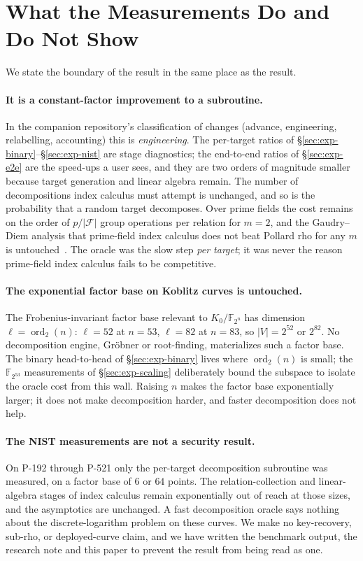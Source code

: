 \documentclass[10pt,a4paper]{article}
\theoremstyle{remark}
\newcommand{\FF}{\mathbb{F}}
\newcommand{\Fb}{\mathcal{F}}
\newcommand{\abs}[1]{\lvert #1 \rvert}
\begin{document}
\section{What the Measurements Do and Do Not Show}
\label{sec:boundary}

We state the boundary of the result in the same place as the result.

\paragraph{It is a constant-factor improvement to a subroutine.} In the
companion repository's classification of changes (advance, engineering,
relabelling, accounting) this is \emph{engineering}. The per-target
ratios of \S\ref{sec:exp-binary}--\S\ref{sec:exp-nist} are stage
diagnostics; the end-to-end ratios of \S\ref{sec:exp-e2e} are the
speed-ups a user sees, and they are two orders of magnitude smaller
because target generation and linear algebra remain. The
number of decompositions index calculus must attempt is unchanged, and
so is the probability that a random target decomposes. Over prime
fields the cost remains on the order of $p/\abs{\Fb}$ group operations
per relation for $m = 2$, and the Gaudry--Diem analysis that
prime-field index calculus does not beat Pollard rho for any $m$ is
untouched~\cite{gaudry2009,diem2011}. The oracle was the slow step
\emph{per target}; it was never the reason prime-field index calculus
fails to be competitive.

\paragraph{The exponential factor base on Koblitz curves is untouched.}
The Frobenius-invariant factor base relevant to $K_0/\FF_{2^n}$ has
dimension $\ell = \operatorname{ord}_2(n)$: $\ell = 52$ at $n = 53$,
$\ell = 82$ at $n = 83$, so $\abs{V} = 2^{52}$ or $2^{82}$. No
decomposition engine, Gr\"obner or root-finding, materializes such a
factor base. The binary head-to-head of \S\ref{sec:exp-binary} lives
where $\operatorname{ord}_2(n)$ is small; the $\FF_{2^{53}}$
measurements of \S\ref{sec:exp-scaling} deliberately bound the subspace
to isolate the oracle cost from this wall. Raising $n$ makes the factor
base exponentially larger; it does not make decomposition harder, and
faster decomposition does not help.

\paragraph{The NIST measurements are not a security result.} On
P-192 through P-521 only the per-target decomposition subroutine was
measured, on a factor base of $6$ or $64$ points. The relation-collection
and linear-algebra stages of index calculus remain exponentially out of
reach at those sizes, and the asymptotics are unchanged. A fast
decomposition oracle says nothing about the discrete-logarithm problem
on these curves. We make no key-recovery, sub-rho, or deployed-curve
claim, and we have written the benchmark output, the research note and
this paper to prevent the result from being read as one.
\end{document}
